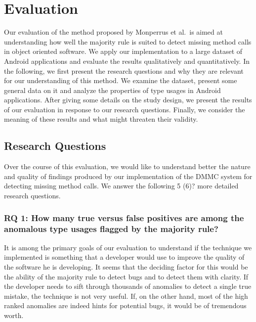 \chapter{Evaluation}\label{ch:eval}

Our evaluation of the method proposed by Monperrus et al.\ is aimed at understanding how well the majority rule is suited to detect missing method calls in object oriented software.
We apply our implementation to a large dataset of Android applications and evaluate the results qualitatively and quantitatively.
In the following, we first present the research questions and why they are relevant for our understanding of this method.
We examine the dataset, present some general data on it and analyze the properties of type usages in Android applications.
After giving some details on the study design, we present the results of our evaluation in response to our research questions.
Finally, we consider the meaning of these results and what might threaten their validity.

\section{Research Questions}

Over the course of this evaluation, we would like to understand better the nature and quality of findings produced by our implementation of the $\text{DMMC}$ system for detecting missing method calls.
We answer the following 5 (6)? more detailed research questions.

\subsection{RQ 1: How many true versus false positives are among the anomalous type usages flagged by the majority rule?}

It is among the primary goals of our evaluation to understand if the technique we implemented is something that a developer would use to improve the quality of the software he is developing.
It seems that the deciding factor for this would be the ability of the majority rule to detect bugs and to detect them with clarity.
If the developer needs to sift through thousands of anomalies to detect a single true mistake, the technique is not very useful.
If, on the other hand, most of the high ranked anomalies are indeed hints for potential bugs, it would be of tremendous worth.


